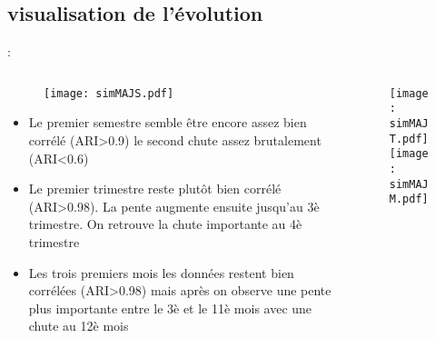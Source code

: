 \documentclass[8pt,aspectratio=169,hyperref={unicode=true}]{beamer}
\begin{document}
\subsection{visualisation de l'évolution}
\begin{frame}{\insertsection: \insertsubsection}
    \begin{columns}[t]
        \begin{column}{.5\textwidth}
            \begin{figure}
                \texttt{[image: simMAJS.pdf]}
            \end{figure}
            \begin{itemize}
                \footnotesize
                \item Le premier semestre semble être encore assez bien corrélé (ARI>0.9) le second chute assez brutalement (ARI<0.6)
                \item Le premier trimestre reste plutôt bien corrélé (ARI>0.98). La pente augmente ensuite jusqu'au 3è trimestre. On retrouve la chute importante au 4è trimestre
                \item Les trois premiers mois les données restent bien corrélées (ARI>0.98) mais après on observe une pente plus importante entre le 3è et le 11è mois avec une chute au 12è mois
            \end{itemize}
        \end{column}
        \begin{column}{.5\textwidth}
            \begin{figure}
                \texttt{[image: simMAJT.pdf]}
                \texttt{[image: simMAJM.pdf]}
            \end{figure}
        \end{column}
    \end{columns}
\end{frame}
\end{document}
